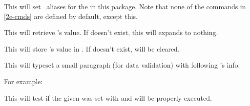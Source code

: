\documentclass[10pt]{article}
\begin{document}
\begin{codedescribe}{\PkgInfoSetAliases}
\begin{codesyntax}%
\tsmacro{\PkgInfoSetAliases}{}
\end{codesyntax}
This will set \LaTeXe\  aliases for the  in this package. Note that none of the commands in \ref{2e-cmds} are defined by default, except  this.
\end{codedescribe}

\begin{codedescribe}{\PkgInfo}
\begin{codesyntax}%
\end{codesyntax}
This will retrieve 's value. If  doesn't exist, this will expands to nothing.
\end{codedescribe}

\begin{codedescribe}{\PkgInfoGet}
\begin{codesyntax}%
\end{codesyntax}
This will store 's value in . If  doesn't exist,  will be cleared.
\end{codedescribe}


\begin{codedescribe}{\PkgInfoDescription}
\begin{codesyntax}%
\end{codesyntax}
This will typeset a small paragraph (for data validation) with following 's info: 
\end{codedescribe}
For example:
\begin{codestore}[demoC]
\end{codestore}




\begin{codedescribe}[code,new=2025/11/01]{\PkgInfoIfSet}
\begin{codesyntax}%
\end{codesyntax}
This will test if the given  was set with \tsobj{\PkgInfoSet} and  will be properly executed.
\end{codedescribe}
\end{document}
